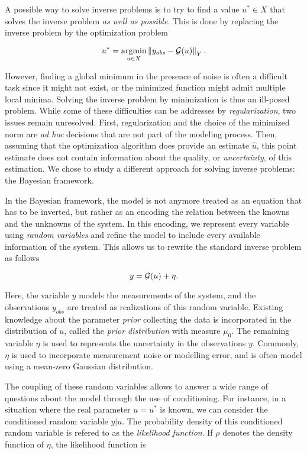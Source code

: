 A possible way to solve inverse problems is to try to find a value $u^* \in X$ that solves the inverse problem \textit{as well as possible}. This is done by replacing the inverse problem by the optimization problem

\begin{equation*}
  u^* = \underset{u \in X}{\text{argmin}} \left\lVert y_{obs} - \mathcal{G}(u) \right\rVert_Y.
\end{equation*}

However, finding a global minimum in the presence of noise is often a difficult task since it might not exist, or the minimized function might admit multiple local minima. Solving the inverse problem by minimization is thus an ill-posed problem. While some of these difficulties can be addresses by \textit{regularization}, two issues remain unresolved. First, regularization and the choice of the minimized norm are \textit{ad hoc} decisions that are not part of the modeling process. Then, assuming that the optimization algorithm does provide an estimate $\hat u$, this point estimate does not contain information about the quality, or \textit{uncertainty}, of this estimation. We chose to study a different approach for solving inverse problems: the Bayesian framework.

In the Bayesian framework, the model is not anymore treated as an equation that has to be inverted, but rather as an encoding the relation between the knowns and the unknowns of the system. In this encoding, we represent every variable using \textit{random variables} and refine the model to include every available information of the system. This allows us to rewrite the standard inverse problem as follows

\begin{equation}
  y = \mathcal{G}(u) + \eta.
\end{equation}

Here, the variable $y$ models the measurements of the system, and the observations $y_{obs}$ are treated as realizations of this random variable. Existing knowledge about the parameter \textit{prior} collecting the data is incorporated in the distribution of $u$, called the \textit{prior distribution} with measure $\mu_0$. The remaining variable $\eta$ is used to represents the uncertainty in the observations $y$. Commonly, $\eta$ is used to incorporate measurement noise or modelling error, and is often model using a mean-zero Gaussian distribution.

The coupling of these random variables allows to answer a wide range of questions about the model through the use of conditioning. For instance, in a situation where the real parameter $u = u^*$ is known, we can consider the conditioned random variable $y|u$. The probability density of this conditioned random variable is refered to as the \textit{likelihood function}. If  $\rho$ denotes the density function of $\eta$, the likelihood function is

